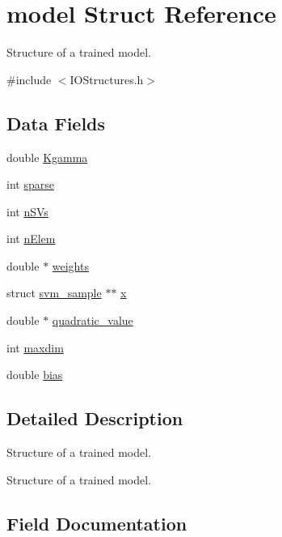 \hypertarget{structmodel}{}\section{model Struct Reference}
\label{structmodel}


Structure of a trained model.  




{\ttfamily \#include $<$I\+O\+Structures.\+h$>$}

\subsection*{Data Fields}
\begin{DoxyCompactItemize}
\item 
double \hyperlink{structmodel_ac5c18eca6ad32bc6da1f2a923965e66c}{Kgamma}
\item 
int \hyperlink{structmodel_ad00b5b9bbafcd18eb6367c90d9471231}{sparse}
\item 
int \hyperlink{structmodel_a3b73d79940bbdae365676c4fa56e96ea}{n\+S\+Vs}
\item 
int \hyperlink{structmodel_a4877089d41daf2186482e0e6f900d65f}{n\+Elem}
\item 
double $\ast$ \hyperlink{structmodel_a658dab89d4b4b1a5bd28cdfb4abafe39}{weights}
\item 
struct \hyperlink{structsvm__sample}{svm\+\_\+sample} $\ast$$\ast$ \hyperlink{structmodel_a81da41c8731f95de344a068d302eb336}{x}
\item 
double $\ast$ \hyperlink{structmodel_a623da3d1f5116fd4d66873b95eb2e720}{quadratic\+\_\+value}
\item 
int \hyperlink{structmodel_ac6ba8c1bc138143114cd331583f41387}{maxdim}
\item 
double \hyperlink{structmodel_a9aef7cc709fca4e03a021623ce6c7ae6}{bias}
\end{DoxyCompactItemize}


\subsection{Detailed Description}
Structure of a trained model. 

Structure of a trained model. 

\subsection{Field Documentation}
\hypertarget{structmodel_a9aef7cc709fca4e03a021623ce6c7ae6}{}\label{structmodel_a9aef7cc709fca4e03a021623ce6c7ae6} 
